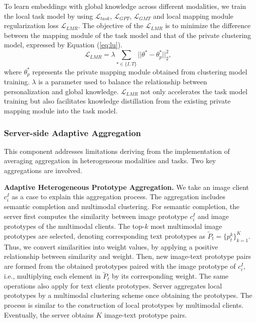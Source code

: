 To learn embeddings with global knowledge across different modalities, we train the local task model by using $\mathcal L_{task}$, $\mathcal L_{GPT}$, $\mathcal L_{GMT}$ and local mapping module regularization loss $\mathcal L_{LMR}$. 
The objective of the $\mathcal L_{LMR}$ is to minimize the difference between the mapping module of the task model and that of the private clustering model, expressed by Equation (\ref{eq:lu}).
\begin{equation}\label{eq:lu}
    \mathcal L_{LMR}=\lambda\sum_{*\in\{I,T\}}||\theta^*-\theta_p^*||_2^2,
\end{equation}
where $\theta_p^*$ represents the private mapping module obtained from clustering model training. 
$\lambda$ is a parameter used to balance the relationship between personalization and global knowledge. 
$\mathcal L_{LMR}$ not only accelerates the task model training but also facilitates knowledge distillation from the existing private mapping module into the task model. 


\subsubsection{Server-side Adaptive Aggregation}\label{agg}
This component addresses limitations deriving from the implementation of averaging aggregation in heterogeneous modalities and tasks. 
Two key aggregations are involved.

\noindent\textbf{Adaptive Heterogeneous Prototype Aggregation.}
We take an image client $c_i^I$ as a case to explain this aggregation process.
The aggregation includes semantic completion and multimodal clustering. For semantic completion, the server first computes the similarity between image prototype $c_i^I$ and image prototypes of the multimodal clients. 
The top-$k$ most multimodal image prototypes are selected, denoting corresponding text prototypes as $\tilde{P}_t = \{p_t^k\}_{k=1}^K$. 
Thus, we convert similarities into weight values, by applying a positive relationship between similarity and weight.
Then, new image-text prototype pairs are formed from the obtained prototypes paired with the image prototype of $c_i^I$, i.e., multiplying each element in $\tilde{P}_t$ by its corresponding weight.
The same operations also apply for text clients prototypes. 
Server aggregates local prototypes by a multimodal clustering scheme once obtaining the prototypes. 
The process is similar to the construction of local prototypes by multimodal clients. 
Eventually, the server obtains $K$ image-text prototype pairs.




